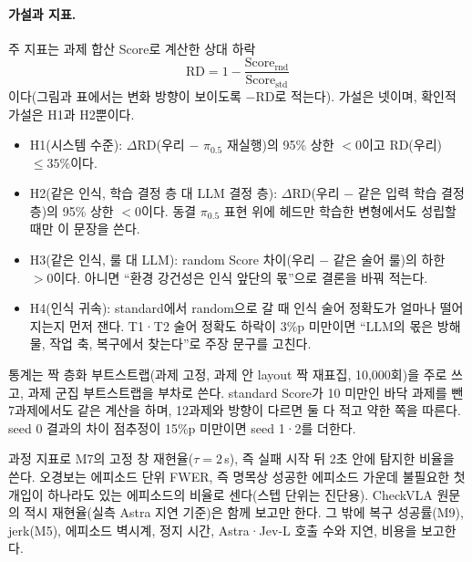 

\paragraph{가설과 지표.}
주 지표는 과제 합산 Score로 계산한 상대 하락
\begin{equation}
  \mathrm{RD} = 1 - \frac{\text{Score}_{\text{rnd}}}{\text{Score}_{\text{std}}}
\end{equation}
이다(그림과 표에서는 변화 방향이 보이도록 $-\mathrm{RD}$로 적는다). 가설은 넷이며, 확인적 가설은 H1과 H2뿐이다.
\begin{itemize}
  \item H1(시스템 수준): $\Delta\mathrm{RD}$(우리 $-$ $\pi_{0.5}$ 재실행)의 95\% 상한 $<0$이고 RD(우리) $\le35\%$이다.
  \item H2(같은 인식, 학습 결정 층 대 LLM 결정 층): $\Delta\mathrm{RD}$(우리 $-$ 같은 입력 학습 결정 층)의 95\% 상한 $<0$이다. 동결 $\pi_{0.5}$ 표현 위에 헤드만 학습한 변형에서도 성립할 때만 이 문장을 쓴다.
  \item H3(같은 인식, 룰 대 LLM): random Score 차이(우리 $-$ 같은 술어 룰)의 하한 $>0$이다. 아니면 ``환경 강건성은 인식 앞단의 몫''으로 결론을 바꿔 적는다.
  \item H4(인식 귀속): standard에서 random으로 갈 때 인식 술어 정확도가 얼마나 떨어지는지 먼저 잰다. T1·T2 술어 정확도 하락이 3\%p 미만이면 ``LLM의 몫은 방해물, 작업 축, 복구에서 찾는다''로 주장 문구를 고친다.
\end{itemize}
통계는 짝 층화 부트스트랩(과제 고정, 과제 안 layout 짝 재표집, 10,000회)을 주로 쓰고, 과제 군집 부트스트랩을 부차로 쓴다. standard Score가 10 미만인 바닥 과제를 뺀 7과제에서도 같은 계산을 하며, 12과제와 방향이 다르면 둘 다 적고 약한 쪽을 따른다. seed 0 결과의 차이 점추정이 15\%p 미만이면 seed 1·2를 더한다.

과정 지표로 M7의 고정 창 재현율($\tau=2$\,s), 즉 실패 시작 뒤 2초 안에 탐지한 비율을 쓴다. 오경보는 에피소드 단위 FWER, 즉 명목상 성공한 에피소드 가운데 불필요한 첫 개입이 하나라도 있는 에피소드의 비율로 센다(스텝 단위는 진단용). CheckVLA 원문의 적시 재현율(실측 Astra 지연 기준)은 함께 보고만 한다. 그 밖에 복구 성공률(M9), jerk(M5), 에피소드 벽시계, 정지 시간, Astra·Jev-L 호출 수와 지연, 비용을 보고한다.

